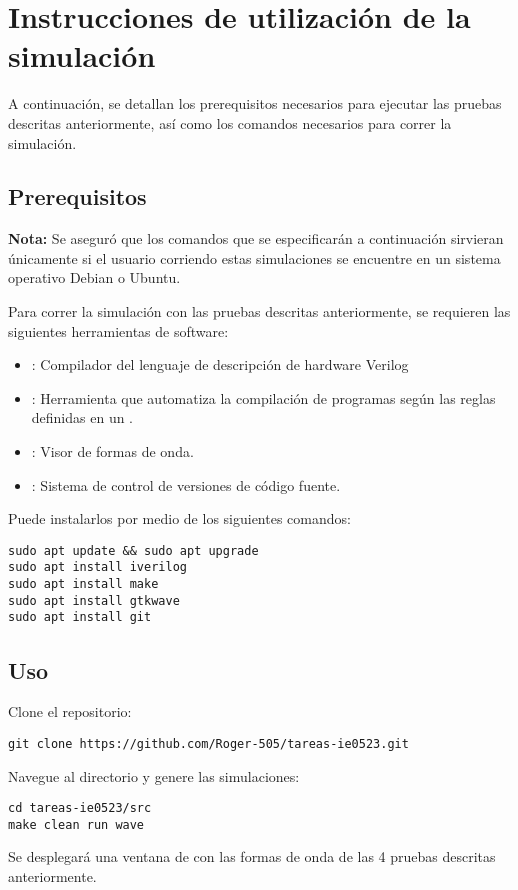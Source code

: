\newpage

\section{Instrucciones de utilización de la simulación}
A continuación, se detallan los prerequisitos necesarios para ejecutar las pruebas descritas anteriormente, así como los comandos necesarios para correr la simulación. 

\subsection{Prerequisitos}
\textbf{Nota:} Se aseguró que los comandos que se especificarán a continuación sirvieran únicamente si el usuario corriendo estas simulaciones se encuentre en un sistema operativo Debian o Ubuntu.

Para correr la simulación con las pruebas descritas anteriormente, se requieren las siguientes herramientas de software:
\begin{itemize}
    \item {}: Compilador del lenguaje de descripción de hardware Verilog
    \item {}: Herramienta que automatiza la compilación de programas según las reglas definidas en un .
    \item {}: Visor de formas de onda.
    \item {}: Sistema de control de versiones de código fuente.
\end{itemize}

Puede instalarlos por medio de los siguientes comandos:

\begin{verbatim}
sudo apt update && sudo apt upgrade
sudo apt install iverilog
sudo apt install make
sudo apt install gtkwave
sudo apt install git
\end{verbatim}

\subsection{Uso}
Clone el repositorio:
\begin{verbatim}
git clone https://github.com/Roger-505/tareas-ie0523.git
\end{verbatim}
Navegue al directorio  y genere las simulaciones:
\begin{verbatim}
cd tareas-ie0523/src    
make clean run wave
\end{verbatim}
Se desplegará una ventana de  con las formas de onda de las 4 pruebas descritas anteriormente.

\newpage
